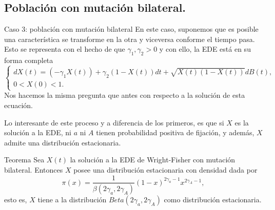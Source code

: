 \documentclass{beamer}
\renewcommand{\1}{\mathds{1}}
\theoremstyle{definition}
\theoremstyle{definition}
\theoremstyle{definition}
\theoremstyle{definition}
\theoremstyle{definition}
\begin{document}
\subsection{Población con mutación bilateral.}
\begin{frame}{Caso 3: población con mutación bilateral}
    En este caso, suponemos que es posible una característica se transforme en la otra y viceversa conforme 
    el tiempo pasa. Esto se representa con el hecho de que $\gamma_1,\gamma_2>0$ y con ello, la EDE
    está en su forma completa 
    \[
        \begin{cases}
            dX(t)=(-\gamma_1X(t))+\gamma_2(1-X(t))dt+\sqrt{X(t)(1-X(t))}dB(t),\\
             0<X(0)<1.
        \end{cases}
    \]
    Nos hacemos la misma pregunta que antes con respecto a la solución de esta ecuación.
\end{frame}
\begin{frame}{}
    Lo interesante de este proceso y a diferencia de los primeros, es que si $X$ es la solución a la EDE,
    ni $a$ ni $A$ tienen probabilidad positiva de fijación, y además, $X$ admite una distribución estacionaria.
    \begin{block}{Teorema}
        Sea $X(t)$ la solución a la EDE de Wright-Fisher con mutación bilateral. Entonces 
        $X$ posee una distribución estacionaria con densidad dada por  
        \[
        \pi(x)= \frac{1}{\beta(2\gamma_a,2\gamma_A)}(1-x)^{2\gamma_a-1}x^{2\gamma_A-1},
        \]
        esto es, $X$ tiene a la distribución $Beta(2\gamma_a,2\gamma_A)$ como distribución 
        estacionaria.
    \end{block}  
\end{frame}
\end{document}
